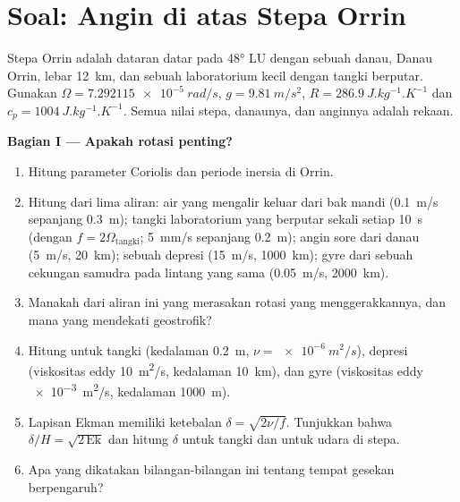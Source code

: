 \section{Soal: Angin di atas Stepa Orrin}

\begin{problem}
\label{pb:b3:gfd-foundations:1}
Stepa Orrin adalah dataran datar pada \ang{48} LU dengan sebuah danau, Danau Orrin,
lebar \qty{12}{km}, dan sebuah laboratorium kecil dengan tangki berputar. Gunakan
$\Omega = \qty{7.292115e-5}{rad/s}$, $g = \qty{9.81}{m/s^2}$, $R =
\qty{286.9}{J.kg^{-1}.K^{-1}}$ dan $c_p = \qty{1004}{J.kg^{-1}.K^{-1}}$.
Semua nilai stepa, danaunya, dan anginnya adalah rekaan.

\medskip\noindent\textbf{Bagian I --- Apakah rotasi penting?}
\begin{enumerate}
\item Hitung parameter Coriolis dan periode inersia di Orrin.
\item Hitung  dari lima aliran: air yang mengalir keluar dari bak mandi
  (\qty{0.1}{m/s} sepanjang \qty{0.3}{m}); tangki laboratorium yang berputar
  sekali setiap \qty{10}{s} (dengan $f = 2\Omega_{\text{tangki}}$; \qty{5}{mm/s}
  sepanjang \qty{0.2}{m}); angin sore dari danau (\qty{5}{m/s},
  \qty{20}{km}); sebuah depresi (\qty{15}{m/s}, \qty{1000}{km}); gyre dari sebuah
  cekungan samudra pada lintang yang sama (\qty{0.05}{m/s}, \qty{2000}{km}).
\item Manakah dari aliran ini yang merasakan rotasi yang menggerakkannya, dan mana yang
  mendekati geostrofik?
\item Hitung  untuk tangki (kedalaman \qty{0.2}{m}, $\nu =
  \qty{e-6}{m^2/s}$), depresi (viskositas eddy \qty{10}{m^2/s},
  kedalaman \qty{10}{km}), dan gyre (viskositas eddy \qty{e-3}{m^2/s},
  kedalaman \qty{1000}{m}).
\item Lapisan Ekman memiliki ketebalan $\delta = \sqrt{2\nu/f}$. Tunjukkan bahwa
  $\delta/H = \sqrt{2\,\mathrm{Ek}}$ dan hitung $\delta$ untuk tangki dan untuk
  udara di stepa.
\item Apa yang dikatakan bilangan-bilangan ini tentang tempat gesekan berpengaruh?
\end{enumerate}


\end{problem}
